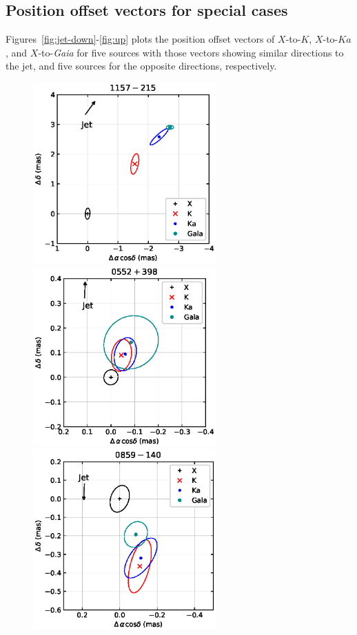 \documentclass{aa}
\begin{document}
\begin{appendix} %

\section{Position offset vectors for special cases} \label{app:align}
    Figures~\ref{fig:jet-down}-\ref{fig:up} plots the position offset vectors of $X$-to-$K$, $X$-to-$Ka$, and $X$-to-\textit{Gaia} for five sources with those vectors showing similar directions to the jet, and five sources for the opposite directions, respectively.

    \begin{figure}[hbtp]
        \centering
        \includegraphics[width=70mm]{figs/1157-215}
        \includegraphics[width=70mm]{figs/0552+398}
        \includegraphics[width=70mm]{figs/0859-140}

\end{figure}
\end{appendix}
\end{document}
